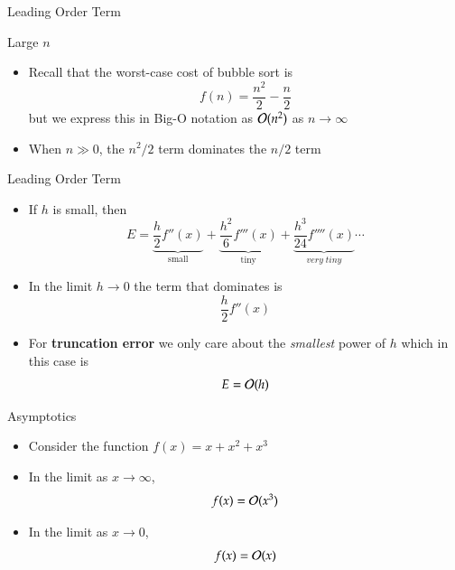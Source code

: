 \documentclass[10pt]{beamer}
\begin{document}
\begin{frame}{Leading Order Term}

\begin{block}{Large $n$}
\begin{itemize}
    \item Recall that the worst-case 
    cost of bubble sort is 
    $$f(n) = \frac{n^2}{2}-\frac{n}{2}$$
    but we express this in Big-O notation as ${\mathcal{O}}(n^2)$ as $n\rightarrow\infty$
    \vfill 
    \item When $n\gg0$, the $n^2/2$ term dominates the $n/2$ term
\end{itemize}
\end{block}

\end{frame}
\begin{frame}{Leading Order Term}

\begin{itemize}
    \item  If $h$ is small, then
    $$E=\underbrace{\frac{h}{2}f''(x)}_{\text{small}} + \underbrace{\frac{h^2}{6}f'''(x)}_{\text{tiny}}+\underbrace{\frac{h^3}{24}f''''(x)}_{very\; tiny}\cdots$$
    \vfill 
    \item In the limit $h\rightarrow0$ the term that dominates is 
    $$\frac{h}{2}f''(x)$$
    \vfill
    \item For \textbf{truncation error} we only care about the \textit{smallest} power of $h$ which in this case is
        $$E = {\mathcal{O}}(h)$$
        \vfill
\end{itemize}
\end{frame}

\begin{frame}{Asymptotics}

\begin{itemize}
    \item Consider the function $f(x) = x + x^2 + x^3 $
    \vfill 
    \item In the limit as $x\rightarrow \infty$, 
    $$ f(x) = {\mathcal{O}}(x^3)$$
    \vfill 
    \item In the limit as $x\rightarrow 0$, 
    $$f(x) = {\mathcal{O}}(x)$$
    \vfill 
\end{itemize}

    
\end{frame}
\end{document}
